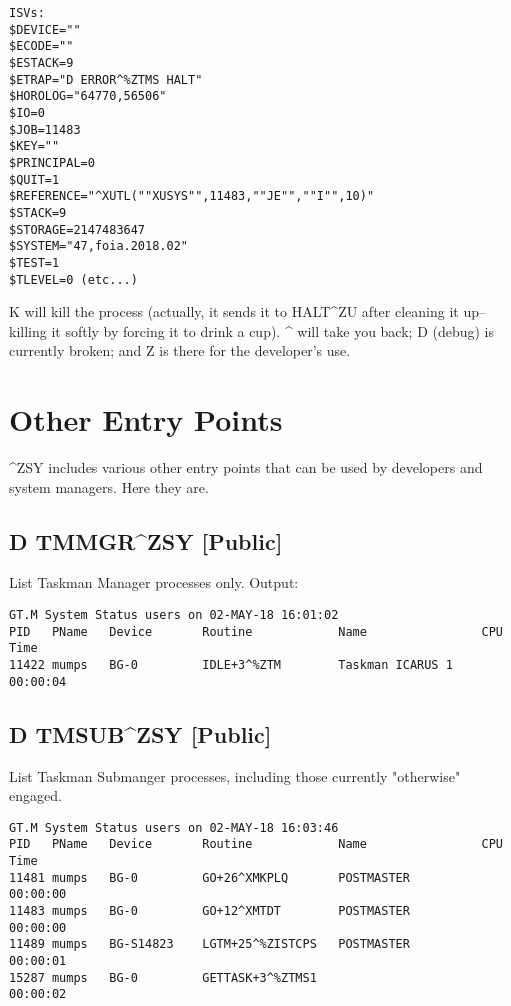 \documentclass[]{article}
\begin{document}
\lstset{
	caption=ISV List
}
\begin{lstlisting}
ISVs: 
$DEVICE=""
$ECODE=""
$ESTACK=9
$ETRAP="D ERROR^%ZTMS HALT"
$HOROLOG="64770,56506"
$IO=0
$JOB=11483
$KEY=""
$PRINCIPAL=0
$QUIT=1
$REFERENCE="^XUTL(""XUSYS"",11483,""JE"",""I"",10)"
$STACK=9
$STORAGE=2147483647
$SYSTEM="47,foia.2018.02"
$TEST=1
$TLEVEL=0 (etc...)
\end{lstlisting}

K will kill the process (actually, it sends it to HALT\^{}ZU after cleaning it up--killing it softly by forcing it to drink a cup). \^{} will take you back; D (debug) is currently broken; and Z is there for the developer's use.

\pagebreak

\section{Other Entry Points}
\^{}ZSY includes various other entry points that can be used by developers and system managers. Here they are.

\subsection{D TMMGR\^{}ZSY [Public]}
List Taskman Manager processes only. Output:
\lstset{
	caption=TMMGR Entry Point
}
\begin{lstlisting}
GT.M System Status users on 02-MAY-18 16:01:02
PID   PName   Device       Routine            Name                CPU Time
11422 mumps   BG-0         IDLE+3^%ZTM        Taskman ICARUS 1    00:00:04
\end{lstlisting}

\subsection{D TMSUB\^{}ZSY [Public]}
List Taskman Submanger processes, including those currently "otherwise" engaged.
\lstset{
	caption=TMSUB Entry Point
}
\begin{lstlisting}
GT.M System Status users on 02-MAY-18 16:03:46
PID   PName   Device       Routine            Name                CPU Time
11481 mumps   BG-0         GO+26^XMKPLQ       POSTMASTER          00:00:00
11483 mumps   BG-0         GO+12^XMTDT        POSTMASTER          00:00:00
11489 mumps   BG-S14823    LGTM+25^%ZISTCPS   POSTMASTER          00:00:01
15287 mumps   BG-0         GETTASK+3^%ZTMS1                       00:00:02
\end{lstlisting}
\end{document}
